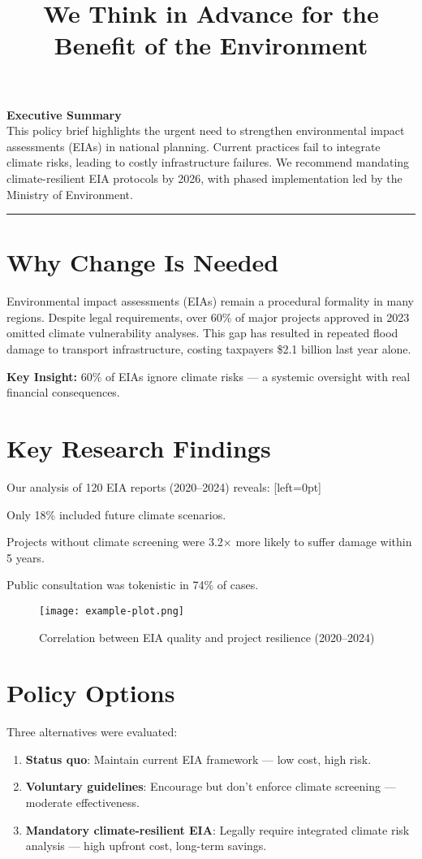 \documentclass[a4paper,11pt]{article}
\title{\color{highlight}\textbf{We Think in Advance for the Benefit of the Environment}}
\author{}
\date{}
\newcommand{\keypoint}[1]{%
  \noindent\colorbox{highlight!10}{\parbox{\dimexpr\linewidth-2\fboxsep}{\textbf{Key Insight:} #1}}\vspace{0.5em}
}
\begin{document}
\maketitle

\noindent\textbf{\large Executive Summary}\\[0.5em]
This policy brief highlights the urgent need to strengthen environmental impact assessments (EIAs) in national planning. Current practices fail to integrate climate risks, leading to costly infrastructure failures. We recommend mandating climate-resilient EIA protocols by 2026, with phased implementation led by the Ministry of Environment.

\vspace{1em}
\hrule
\vspace{1.5em}

\section*{Why Change Is Needed}
Environmental impact assessments (EIAs) remain a procedural formality in many regions. Despite legal requirements, over 60\% of major projects approved in 2023 omitted climate vulnerability analyses. This gap has resulted in repeated flood damage to transport infrastructure, costing taxpayers \$2.1 billion last year alone.

\keypoint{60\% of EIAs ignore climate risks — a systemic oversight with real financial consequences.}

\section*{Key Research Findings}
Our analysis of 120 EIA reports (2020–2024) reveals:
[left=0pt]
    \item Only 18\% included future climate scenarios.
    \item Projects without climate screening were 3.2× more likely to suffer damage within 5 years.
    \item Public consultation was tokenistic in 74\% of cases.

\begin{figure}[h]
\centering
\texttt{[image: example-plot.png]} %
\caption{Correlation between EIA quality and project resilience (2020–2024)}
\end{figure}

\section*{Policy Options}
Three alternatives were evaluated:
\begin{enumerate}
    \item \textbf{Status quo}: Maintain current EIA framework — low cost, high risk.
    \item \textbf{Voluntary guidelines}: Encourage but don’t enforce climate screening — moderate effectiveness.
    \item \textbf{Mandatory climate-resilient EIA}: Legally require integrated climate risk analysis — high upfront cost, long-term savings.
\end{enumerate}
\end{document}
